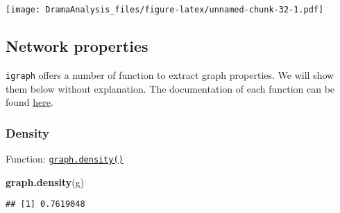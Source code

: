 \documentclass[]{book}
\newenvironment{Shaded}{\begin{snugshade}}{\end{snugshade}}
\newcommand{\CommentTok}[1]{\textcolor[rgb]{0.56,0.35,0.01}{\textit{#1}}}
\newcommand{\DataTypeTok}[1]{\textcolor[rgb]{0.13,0.29,0.53}{#1}}
\newcommand{\DecValTok}[1]{\textcolor[rgb]{0.00,0.00,0.81}{#1}}
\newcommand{\FloatTok}[1]{\textcolor[rgb]{0.00,0.00,0.81}{#1}}
\newcommand{\KeywordTok}[1]{\textcolor[rgb]{0.13,0.29,0.53}{\textbf{#1}}}
\newcommand{\NormalTok}[1]{#1}
\newcommand{\OperatorTok}[1]{\textcolor[rgb]{0.81,0.36,0.00}{\textbf{#1}}}
\newcommand{\OtherTok}[1]{\textcolor[rgb]{0.56,0.35,0.01}{#1}}
\newcommand{\StringTok}[1]{\textcolor[rgb]{0.31,0.60,0.02}{#1}}
\begin{document}
\begin{Shaded}
\end{Shaded}

\texttt{[image: DramaAnalysis\_files/figure-latex/unnamed-chunk-32-1.pdf]}

\hypertarget{network-properties}{%
\subsection{Network properties}\label{network-properties}}

\texttt{igraph} offers a number of function to extract graph properties. We will show them below without explanation. The documentation of each function can be found \href{https://igraph.org/r/doc/}{here}.

\hypertarget{density}{%
\subsubsection{Density}\label{density}}

Function: \href{https://igraph.org/r/doc/edge_density.html}{\texttt{graph.density()}}

\begin{Shaded}
\begin{Highlighting}[]
\KeywordTok{graph.density}\NormalTok{(g)}
\end{Highlighting}
\end{Shaded}

\begin{verbatim}
## [1] 0.7619048
\end{verbatim}
\end{document}
